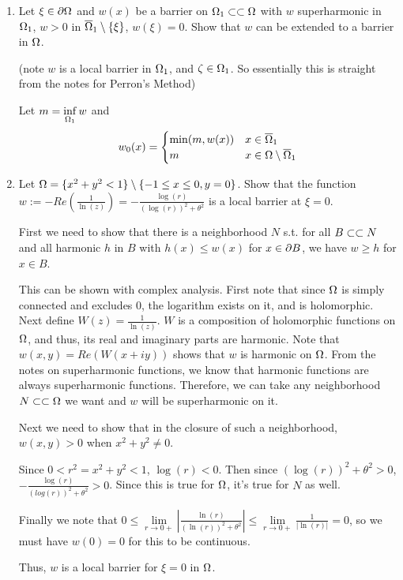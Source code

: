 \begin{enumerate}
\item
  Let $\xi \in \partial \Omega$ and $w(x)$ be a barrier on $\Omega_1 \subset \subset \Omega$ with $w$ superharmonic in $\Omega_1$, $w > 0$
  in $\overline{\Omega}_1 \setminus \{ \xi \}$, $w(\xi) = 0$.
  Show that $w$ can be extended to a barrier in $\Omega$.

  (note $w$ is a local barrier in $\Omega_1$, and $\zeta \in \Omega_1$.
  So essentially this is straight from the notes for Perron's Method)

  Let $m = \inf \limits_{\Omega_1} w$ and
  $$
  w_0(x) =
  \begin{cases}
    \min(m, w(x)) & x \in \overline{\Omega}_1\\
    m & x \in \Omega \setminus \overline{\Omega}_1
  \end{cases}
  $$

\item
  Let $\Omega = \{ x^2 + y^2 < 1 \} \setminus \{ -1 \leq x \leq 0, y = 0 \}$.
  Show that the function $w := -Re\left( \frac{1}{\ln(z)} \right) = - \frac{\log(r)}{(\log(r))^2 + \theta^2}$ is a local barrier at $\xi = 0$.

  First we need to show that there is a neighborhood $N$ s.t.
  for all $B \subset \subset N$ and all harmonic $h$ in $B$ with $h(x) \leq w(x)$ for $x \in \partial B$,
  we have $w \geq h$ for $x \in B$.

  This can be shown with complex analysis.
  First note that since $\Omega$ is simply connected and excludes $0$, the logarithm exists on it, and is holomorphic.
  Next define $W(z) = \frac{1}{\ln(z)}$.
  $W$ is a composition of holomorphic functions on $\Omega$, and thus, its real and imaginary parts are harmonic.
  Note that $w(x, y) = Re(W(x + i y))$ shows that $w$ is harmonic on $\Omega$.
  From the notes on superharmonic functions, we know that harmonic functions are always superharmonic functions.
  Therefore, we can take any neighborhood $N \subset \subset \Omega$ we want and $w$ will be superharmonic on it.

  Next we need to show that in the closure of such a neighborhood, $w(x, y) > 0$ when $x^2 + y^2 \neq 0$.

  Since $0 < r^2 = x^2 + y^2 < 1$, $\log \left( r \right) < 0$.
  Then since $(\log(r))^2 + \theta^2 > 0$, $-\frac{\log(r)}{(log(r))^2 + \theta^2} > 0$.
  Since this is true for $\Omega$, it's true for $N$ as well.

  Finally we note that $0 \leq \lim \limits_{r \rightarrow 0+} \left| \frac{\ln(r)}{(\ln(r))^2 + \theta^2} \right| \leq \lim \limits_{r \rightarrow 0+} \frac{1}{|\ln(r)|} = 0$,
  so we must have $w(0) = 0$ for this to be continuous.

  Thus, $w$ is a local barrier for $\xi = 0$ in $\Omega$.
\end{enumerate}
